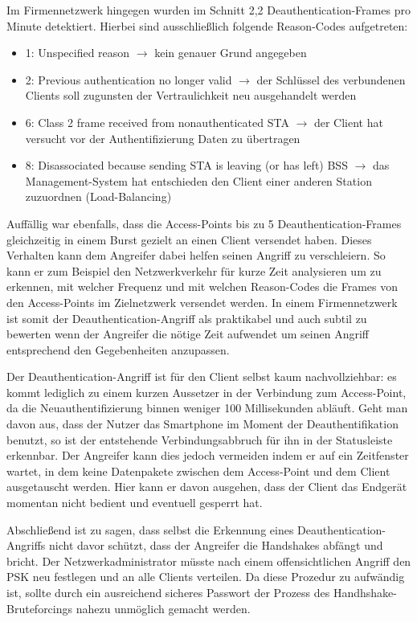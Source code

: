Im Firmennetzwerk hingegen wurden im Schnitt 2,2 Deauthentication-Frames pro Minute detektiert.
Hierbei sind ausschließlich folgende Reason-Codes aufgetreten:
\begin{itemize}
	\item 1: Unspecified reason $\rightarrow$ kein genauer Grund angegeben
	\item 2: Previous authentication no longer valid $\rightarrow$ der Schlüssel des verbundenen Clients soll zugunsten der Vertraulichkeit neu ausgehandelt werden
	\item 6: Class 2 frame received from nonauthenticated STA $\rightarrow$ der Client hat versucht vor der Authentifizierung Daten zu übertragen
	\item 8: Disassociated because sending STA is leaving (or has left) BSS $\rightarrow$ das Management-System hat entschieden den Client einer anderen Station zuzuordnen (Load-Balancing)
\end{itemize}
Auffällig war ebenfalls, dass die Access-Points bis zu 5 Deauthentication-Frames gleichzeitig in einem Burst gezielt an einen Client versendet haben.
Dieses Verhalten kann dem Angreifer dabei helfen seinen Angriff zu verschleiern.
So kann er zum Beispiel den Netzwerkverkehr für kurze Zeit analysieren um zu erkennen, mit welcher Frequenz und mit welchen Reason-Codes die Frames von den Access-Points im Zielnetzwerk versendet werden.
In einem Firmennetzwerk ist somit der Deauthentication-Angriff als praktikabel und auch subtil zu bewerten wenn der Angreifer die nötige Zeit aufwendet um seinen Angriff entsprechend den Gegebenheiten anzupassen.

Der Deauthentication-Angriff ist für den Client selbst kaum nachvollziehbar: es kommt lediglich zu einem kurzen Aussetzer in der Verbindung zum Access-Point, da die Neuauthentifizierung binnen weniger 100 Millisekunden abläuft.
Geht man davon aus, dass der Nutzer das Smartphone im Moment der Deauthentifikation benutzt, so ist der entstehende Verbindungsabbruch für ihn in der Statusleiste erkennbar.
Der Angreifer kann dies jedoch vermeiden indem er auf ein Zeitfenster wartet, in dem keine Datenpakete zwischen dem Access-Point und dem Client ausgetauscht werden.
Hier kann er davon ausgehen, dass der Client das Endgerät momentan nicht bedient und eventuell gesperrt hat.

Abschließend ist zu sagen, dass selbst die Erkennung eines Deauthentication-Angriffs nicht davor schützt, dass der Angreifer die Handshakes abfängt und bricht.
Der Netzwerkadministrator müsste nach einem offensichtlichen Angriff den PSK neu festlegen und an alle Clients verteilen.
Da diese Prozedur zu aufwändig ist, sollte durch ein ausreichend sicheres Passwort der Prozess des Handhshake-Bruteforcings nahezu unmöglich gemacht werden.


